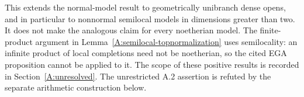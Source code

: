\begin{remark}
This extends the normal-model result to geometrically unibranch
dense opens, and in particular to nonnormal semilocal models in
dimensions greater than two. It does not make the analogous
claim for every noetherian model. The finite-product argument
in Lemma~\ref{A:semilocal-topnormalization} uses semilocality:
an infinite product of local completions need not be noetherian,
so the cited EGA proposition cannot be applied to it. The
scope of these positive results is recorded in
Section~\ref{A:unresolved}. The unrestricted A.2 assertion is refuted
by the separate arithmetic construction below.
\end{remark}
